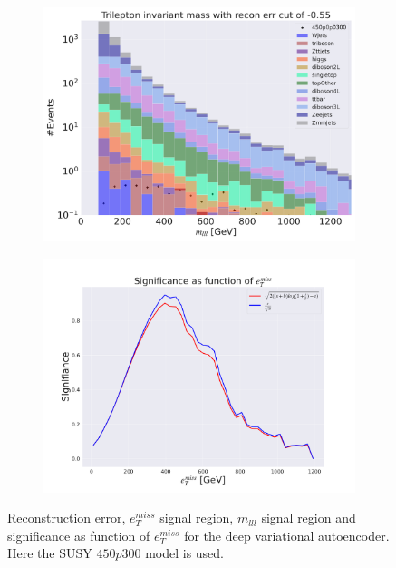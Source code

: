 \begin{figure}[H]
    \hfill
    \begin{subfigure}{.40\textwidth}
        \includegraphics[width=\textwidth]{Figures/VAE_testing/big/3lep/b_data_recon_big_rm3_feats_sig_450p0p0300_mlll_recon_errcut_-0.55.pdf}
        \caption{}
        \label{fig:VAE_3lep_big_mlll_450_3}
    \end{subfigure}
    \hfill   
    \begin{subfigure}{.40\textwidth}
        \includegraphics[width=\textwidth]{Figures/VAE_testing/big/3lep/significance_etmiss_450p0p0300_-0.5484574357785665.pdf}
        \caption{}
        \label{fig:VAE_3lep_big_signi_450_3}
    \end{subfigure}
    \hfill      
    \caption[3lep deep network | $450p300$ | VAE | 3]{Reconstruction error, $e_T^{miss}$ signal region, $m_{lll}$ signal region and significance as function of 
    $e_T^{miss}$ for the deep variational autoencoder. Here the SUSY $450p300$ model is used.}
    \label{fig:VAE_3lep_big_rec_sig_signi_450_3}
\end{figure}

